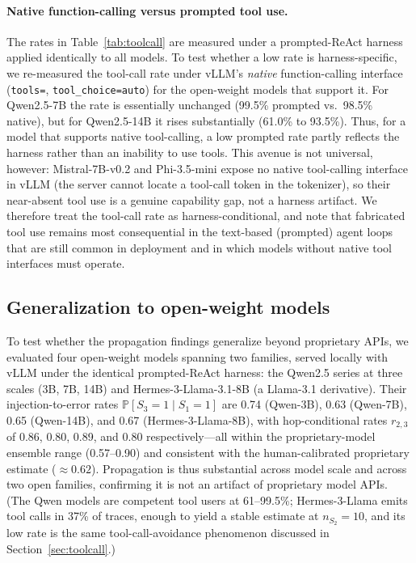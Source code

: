 \documentclass{ieeeaccess}
\renewcommand{\Pr}{\mathbb{P}}
\begin{document}
\paragraph{Native function-calling versus prompted tool use.}
The rates in Table~\ref{tab:toolcall} are measured under a prompted-ReAct
harness applied identically to all models. To test whether a low rate is
harness-specific, we re-measured the tool-call rate under vLLM's \emph{native}
function-calling interface (\texttt{tools=}, \texttt{tool\_choice=auto}) for the
open-weight models that support it. For Qwen2.5-7B the rate is essentially
unchanged (99.5\% prompted vs.\ 98.5\% native), but for Qwen2.5-14B it rises
substantially (61.0\% to 93.5\%). Thus, for a model that supports native
tool-calling, a low prompted rate partly reflects the harness rather than an
inability to use tools. This avenue is not universal, however:
Mistral-7B-v0.2 and Phi-3.5-mini expose no native tool-calling interface in
vLLM (the server cannot locate a tool-call token in the tokenizer), so their
near-absent tool use is a genuine capability gap, not a harness artifact. We
therefore treat the tool-call rate as harness-conditional, and note that
fabricated tool use remains most consequential in the text-based (prompted)
agent loops that are still common in deployment and in which models without
native tool interfaces must operate.

\subsection{Generalization to open-weight models}
\label{sec:openweight}

To test whether the propagation findings generalize beyond proprietary APIs, we
evaluated four open-weight models spanning two families, served locally with
vLLM under the identical prompted-ReAct harness: the Qwen2.5 series at three
scales (3B, 7B, 14B) and Hermes-3-Llama-3.1-8B (a Llama-3.1 derivative). Their
injection-to-error rates $\Pr[S_3{=}1 \mid S_1{=}1]$ are 0.74 (Qwen-3B), 0.63
(Qwen-7B), 0.65 (Qwen-14B), and 0.67 (Hermes-3-Llama-8B), with hop-conditional
rates $r_{2,3}$ of 0.86, 0.80, 0.89, and 0.80 respectively---all within the
proprietary-model ensemble range (0.57--0.90) and consistent with the
human-calibrated proprietary estimate ($\approx 0.62$). Propagation is thus
substantial across model scale and across two open families, confirming it is
not an artifact of proprietary model APIs. (The Qwen models are competent tool
users at 61--99.5\%; Hermes-3-Llama emits tool calls in 37\% of traces, enough
to yield a stable estimate at $n_{S_2}{=}10$, and its low rate is the same
tool-call-avoidance phenomenon discussed in Section~\ref{sec:toolcall}.)
\end{document}
